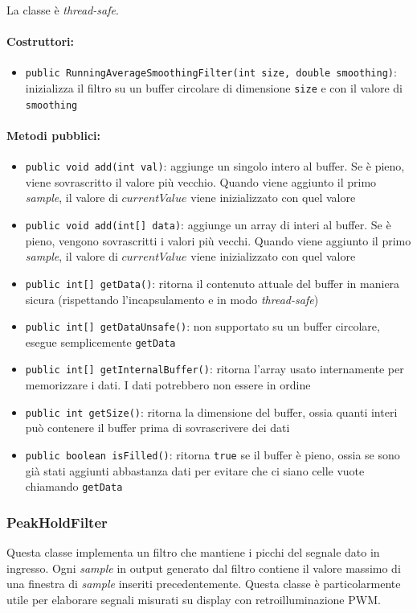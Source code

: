 La classe è \textit{thread-safe}.

\paragraph{Costruttori:} \begin{itemize}
	\item \texttt{public RunningAverageSmoothingFilter(int size, double smoothing)}: inizializza il filtro su un buffer circolare di dimensione \texttt{size} e con il valore di \texttt{smoothing}
\end{itemize}

\paragraph{Metodi pubblici:} \begin{itemize}
	\item \texttt{public void add(int val)}: aggiunge un singolo intero al buffer. Se è pieno, viene sovrascritto il valore più vecchio. Quando viene aggiunto il primo \textit{sample}, il valore di $currentValue$ viene inizializzato con quel valore
	\item \texttt{public void add(int[] data)}: aggiunge un array di interi al buffer. Se è pieno, vengono sovrascritti i valori più vecchi. Quando viene aggiunto il primo \textit{sample}, il valore di $currentValue$ viene inizializzato con quel valore
	\item \texttt{public int[] getData()}: ritorna il contenuto attuale del buffer in maniera sicura (rispettando l'incapsulamento e in modo \textit{thread-safe})
	\item \texttt{public int[] getDataUnsafe()}: non supportato su un buffer circolare, esegue semplicemente \texttt{getData}
	\item \texttt{public int[] getInternalBuffer()}: ritorna l'array usato internamente per memorizzare i dati. I dati potrebbero non essere in ordine
	\item \texttt{public int getSize()}: ritorna la dimensione del buffer, ossia quanti interi può contenere il buffer prima di sovrascrivere dei dati
	\item \texttt{public boolean isFilled()}: ritorna \texttt{true} se il buffer è pieno, ossia se sono già stati aggiunti abbastanza dati per evitare che ci siano celle vuote chiamando \texttt{getData}
\end{itemize}

\subsubsection{PeakHoldFilter}
Questa classe implementa un filtro che mantiene i picchi del segnale dato in ingresso. Ogni \textit{sample} in output generato dal filtro contiene il valore massimo di una finestra di \textit{sample} inseriti precedentemente. Questa classe è particolarmente utile per elaborare segnali misurati su display con retroilluminazione PWM.

